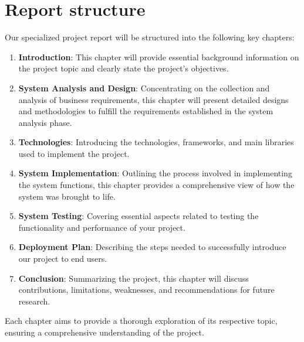 \section{Report structure}
Our specialized project report will be structured into the following key chapters:
\begin{enumerate}
    \item \textbf{Introduction}: This chapter will provide essential background information on the project topic and clearly state the project’s objectives.
    \item \textbf{System Analysis and Design}:  Concentrating on the collection and analysis of business requirements, this chapter will present detailed designs and methodologies to fulfill the requirements established in the system analysis phase.
    \item \textbf{Technologies}: Introducing the technologies, frameworks, and main libraries used to implement the project.
    \item \textbf{System Implementation}: Outlining the process involved in implementing the system functions, this chapter provides a comprehensive view of how the system was brought to life.
    \item \textbf{System Testing}:  Covering essential aspects related to testing the functionality and performance of your project.
    \item \textbf{Deployment Plan}: Describing the steps needed to successfully introduce our project to end users.
    \item \textbf{Conclusion}:  Summarizing the project, this chapter will discuss contributions, limitations, weaknesses, and recommendations for future research.
\end{enumerate}


Each chapter aims to provide a thorough exploration of its respective topic, ensuring a comprehensive understanding of the project.